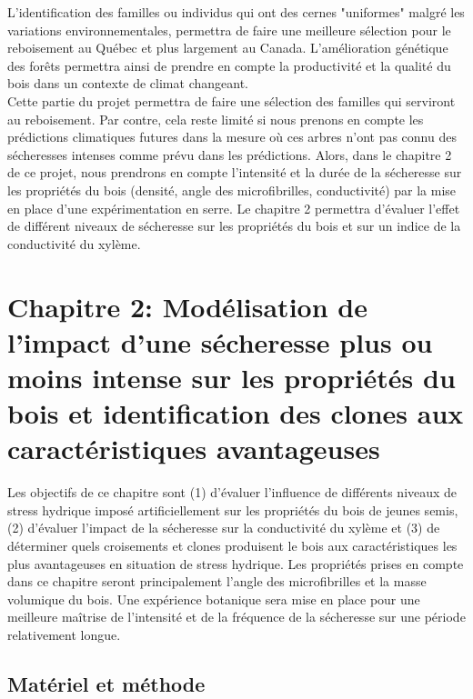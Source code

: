 \documentclass[a4paper,12pt]{report}
\begin{document}
L'identification des familles ou individus qui ont des cernes "uniformes" malgré les variations environnementales, permettra de faire une meilleure sélection pour le reboisement au Québec et plus largement au Canada. L'amélioration génétique des forêts permettra ainsi de prendre en compte la productivité et la qualité du bois dans un contexte de climat changeant.\\

Cette partie du projet permettra de faire une sélection des familles qui serviront au reboisement. Par contre, cela reste limité si nous prenons en compte les prédictions climatiques futures dans la mesure où ces arbres n'ont pas connu des sécheresses intenses comme prévu dans les prédictions. Alors, dans le chapitre 2 de ce projet, nous prendrons en compte l'intensité et la durée de la sécheresse sur les propriétés du bois (densité, angle des microfibrilles, conductivité) par la mise en place d'une expérimentation en serre. Le chapitre 2 permettra d'évaluer l'effet de différent niveaux de sécheresse sur les propriétés du bois et sur un indice de la conductivité du xylème.



\chapter{Chapitre 2: Modélisation de l'impact d'une sécheresse plus ou moins intense sur les propriétés du bois et identification des clones aux caractéristiques avantageuses}

Les objectifs de ce chapitre sont (1) d'évaluer l'influence de différents niveaux de stress hydrique imposé artificiellement sur les propriétés du bois de jeunes semis, (2) d'évaluer l'impact de la sécheresse sur la conductivité du xylème et (3) de déterminer quels croisements et clones produisent le bois aux caractéristiques les plus avantageuses en situation de stress hydrique. Les propriétés prises en compte dans ce chapitre seront principalement l'angle des microfibrilles et la masse volumique du bois. Une expérience botanique sera mise en place pour une meilleure maîtrise de l'intensité et de la fréquence de la sécheresse sur une période relativement longue.   


\section{Matériel et méthode}
\end{document}
